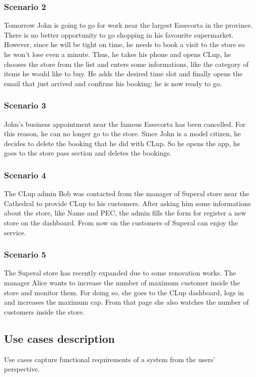 		\subsubsection{Scenario 2}
		Tomorrow John is going to go for work near the largest Essecorta in the province. There is no better opportunity to go shopping in his favourite supermarket.\newline
		However, since he will be tight on time, he needs to book a visit to the store so he won't lose even a minute. Thus, he takes his phone and opens CLup, he chooses the store from the list and enters some informations, like the category of items he would like to buy. He adds the desired time slot and finally opens the email that just arrived and confirms his booking: he is now ready to go.
		\subsubsection{Scenario 3}
		John's business appointment near the famous Essecorta has been cancelled. For this reason, he can no longer go to the store.\newline
		Since John is a model citizen, he decides to delete the booking that he did with CLup. So he opens the app, he goes to the store pass section and deletes the bookings.
		\subsubsection{Scenario 4}
		The CLup admin Bob was contacted from the manager of Superal store near the Cathedral to provide CLup to his customers. After asking him some informations about the store, like Name and PEC, the admin fills the form for register a new store on the dashboard. From now on the customers of Superal can enjoy the service.
		\subsubsection{Scenario 5}
		The Superal store has recently expanded due to some renovation works. The manager Alice wants to increase the number of maximum customer inside the store and monitor them.\newline
		For doing so, she goes to the CLup dashboard, logs in and increases the maximum cap. From that page she also watches the number of customers inside the store.

	\clearpage
    \subsection{Use cases description}
    Use cases capture functional requirements of a system from the users' perspective.

